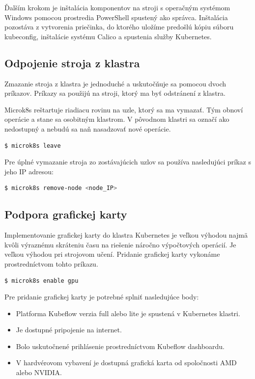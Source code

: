 Ďalším krokom je inštalácia komponentov na stroji s operačným systémom Windows pomocou prostredia PowerShell spustený ako správca. Inštalácia pozostáva z vytvorenia priečinka, do ktorého uložíme predošlú kópiu súboru kubeconfig, inštalácie systému Calico a spustenia služby Kubernetes.

\subsection{Odpojenie stroja z klastra}

Zmazanie stroja z klastra je jednoduché a uskutočňuje sa pomocou dvoch príkazov. Príkazy sa použijú na stroji, ktorý ma byť odstránení z klastra.

Microk8s reštartuje riadiacu rovinu na uzle, ktorý sa ma vymazať. Tým obnoví operácie a stane sa osobitným klastrom. V pôvodnom klastri sa označí ako nedostupný a nebudú sa naň nasadzovať nové operácie.
\begin{lstlisting}[language=Bash]
    $ microk8s leave
    \end{lstlisting}
Pre úplné vymazanie stroja zo zostávajúcich uzlov sa používa nasledujúci príkaz s jeho IP adresou:
\begin{lstlisting}[language=Bash]
    $ microk8s remove-node <node_IP>
    \end{lstlisting}
\subsection{Podpora grafickej karty}

Implementovanie grafickej karty do klastra Kubernetes je veľkou výhodou najmä kvôli výraznému skráteniu času na riešenie náročno výpočtových operácií. Je veľkou výhodou pri strojovom učení. Pridanie grafickej karty vykonáme prostredníctvom tohto príkazu.

\begin{lstlisting}[language=Bash]
    $ microk8s enable gpu
    \end{lstlisting}

Pre pridanie grafickej karty je potrebné splniť nasledujúce body:

\begin{itemize}
    \item Platforma Kubeflow verzia full alebo lite je spustená v Kubernetes klastri.
    \item Je dostupné pripojenie na internet.
    \item Bolo uskutočnené prihlásenie prostredníctvom Kubeflow dashboardu.
    \item V hardvérovom vybavení je dostupná grafická karta od spoločnosti AMD alebo NVIDIA.
\end{itemize}

